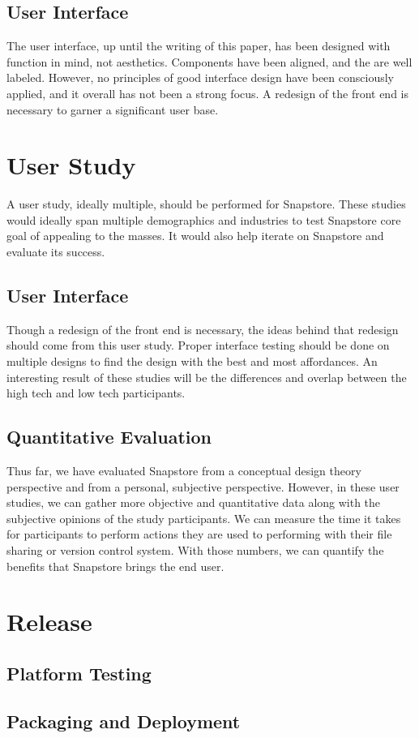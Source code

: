 \subsection{User Interface}

The user interface, up until the writing of this paper, has been designed with function in mind, not aesthetics. Components have been aligned, and the are well labeled. However, no principles of good interface design have been consciously applied, and it overall has not been a strong focus. A redesign of the front end is necessary to garner a significant user base.

\section{User Study}

A user study, ideally multiple, should be performed for Snapstore. These studies would ideally span multiple demographics and industries to test Snapstore core goal of appealing to the masses. It would also help iterate on Snapstore and evaluate its success.

\subsection{User Interface}

Though a redesign of the front end is necessary, the ideas behind that redesign should come from this user study. Proper interface testing should be done on multiple designs to find the design with the best and most affordances. An interesting result of these studies will be the differences and overlap between the high tech and low tech participants.

\subsection{Quantitative Evaluation}

Thus far, we have evaluated Snapstore from a conceptual design theory perspective and from a personal, subjective perspective. However, in these user studies, we can gather more objective and quantitative data along with the subjective opinions of the study participants. We can measure the time it takes for participants to perform actions they are used to performing with their file sharing or version control system. With those numbers, we can quantify the benefits that Snapstore brings the end user.

\section{Release}

\subsection{Platform Testing}

\subsection{Packaging and Deployment}





